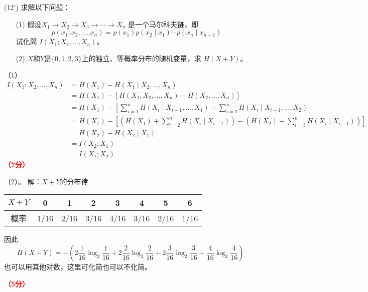 \documentclass[12pt,a4paper,openany,twoside]{ctexbook}
\begin{document}
\begin{exercise}(12')
	求解以下问题：
\begin{itemize}
	\item [(1)] 假设$X_{1} \rightarrow X_{2} \rightarrow X_{3} \rightarrow \cdots \rightarrow X_{n}$ 是一个马尔科夫链，即
	$$
	p\left(x_{1}, x_{2}, \ldots, x_{n}\right)=p\left(x_{1}\right) p\left(x_{2} \mid x_{1}\right) \cdots p\left(x_{n} \mid x_{n-1}\right)
	$$
	试化简 $I\left(X_{1} ; X_{2}, \ldots, X_{n}\right)$。
	\item [(2)] $X$和$Y$是$\{0,1,2,3\}$上的独立、等概率分布的随机变量，求 $H(X+Y)$。
\end{itemize}

\end{exercise}
\begin{Solution}
	（1）$$
	\begin{aligned}
		I\left(X_{1} ; X_{2}, \ldots, X_{n}\right) &=H\left(X_{1}\right)-H\left(X_{1} \mid X_{2}, \ldots, X_{n}\right) \\
		&=H\left(X_{1}\right)-\left[H\left(X_{1}, X_{2}, \ldots, X_{n}\right)-H\left(X_{2}, \ldots, X_{n}\right)\right] \\
		&=H\left(X_{1}\right)-\left[\sum_{i=1}^{n} H\left(X_{i} \mid X_{i-1}, \ldots, X_{1}\right)-\sum_{i=2}^{n} H\left(X_{i} \mid X_{i-1}, \ldots, X_{2}\right)\right] \\
		&=H\left(X_{1}\right)-\left[\left(H\left(X_{1}\right)+\sum_{i=2}^{n} H\left(X_{i} \mid X_{i-1}\right)\right) -\left(H\left(X_{2}\right)+\sum_{i=3}^{n} H\left(X_{i} \mid X_{i-1}\right)\right)\right] \\
		&=H\left(X_{2}\right)-H\left(X_{2} \mid X_{1}\right) \\
		&=I\left(X_{2} ; X_{1}\right) \\
		&=I\left(X_{1} ; X_{2}\right)
	\end{aligned}
	$$
	\hfill \textcolor{red}{\textbf{（7分）}}
	
	
	
	（2）。
	解：$X+Y$的分布律
	
	\begin{table}[H]
		\centering
		\begin{tabular}{cccccccc}
			\hline
			$X+Y$ & 0 & 1 & 2 & 3 & 4 & 5 & 6 \\
			\hline
			概率 & 1/16 & 2/16 & 3/16 & 4/16 & 3/16 & 2/16 & 1/16 \\
			\hline
		\end{tabular}
	\end{table}
	
	因此
	\[
	H(X+Y) =-( 2\frac{1}{16} \log_2 \frac{1}{16} + 2\frac{2}{16} \log_2 \frac{2}{16} + 2\frac{3}{16} \log_2 \frac{3}{16} + \frac{4}{16} \log_2 \frac{4}{16})
	\]
	也可以用其他对数，这里可化简也可以不化简。
	
	\hfill \textcolor{red}{\textbf{（5分）}}
\end{Solution}
\end{document}
